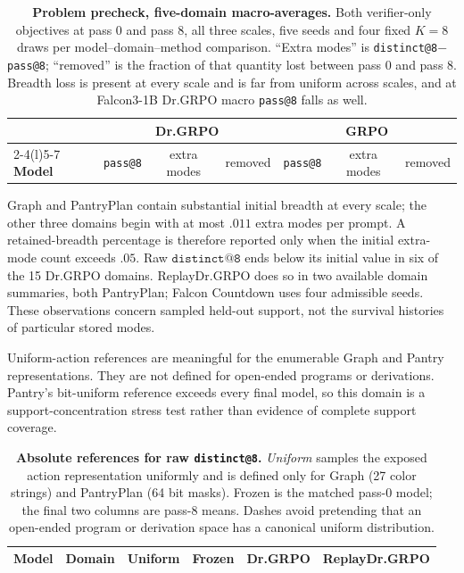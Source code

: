 \begin{table}[h]
  \centering
  \caption{\textbf{Problem precheck, five-domain macro-averages.} Both
  verifier-only objectives at pass 0 and pass 8, all three scales, five seeds
  and four fixed $K=8$ draws per model--domain--method comparison. ``Extra modes'' is
  \texttt{distinct@8}$-$\texttt{pass@8}; ``removed'' is the fraction of that
  quantity lost between pass 0 and pass 8. Breadth loss is present at every
  scale and is far from uniform across scales, and at Falcon3-1B Dr.GRPO
  macro \texttt{pass@8} falls as well.}
  \label{tab:baseline-collapse-precheck}
  \small
  \setlength{\tabcolsep}{4.5pt}
  \begin{tabular}{@{}l*{6}{c}@{}}
    \toprule
    & \multicolumn{3}{c}{\textbf{Dr.GRPO}} & \multicolumn{3}{c}{\textbf{GRPO}} \\
    \cmidrule(lr){2-4}\cmidrule(l){5-7}
    \textbf{Model} & \texttt{pass@8} & extra modes & removed
                   & \texttt{pass@8} & extra modes & removed \\
    \midrule
    
  \end{tabular}
\end{table}


Graph and PantryPlan contain substantial initial breadth at every scale;
the other three domains begin with at most $.011$ extra modes per prompt.
A retained-breadth percentage is therefore reported only when the initial
extra-mode count exceeds $.05$. Raw $\texttt{distinct@8}$ ends below its
initial value in six of the 15 Dr.GRPO domains. ReplayDr.GRPO does so in
two available domain summaries, both PantryPlan; Falcon Countdown uses
four admissible seeds. These observations concern sampled held-out support,
not the survival histories of particular stored modes.

Uniform-action references are meaningful for the enumerable Graph and
Pantry representations. They are not defined for open-ended programs or
derivations. Pantry's bit-uniform reference exceeds every final model, so
this domain is a support-concentration stress test rather than evidence
of complete support coverage.

\begin{table}[t]
  \centering
  \caption{\textbf{Absolute references for raw \texttt{distinct@8}.}
  \emph{Uniform} samples the exposed action representation uniformly and is
  defined only for Graph (27 color strings) and PantryPlan (64 bit masks).
  Frozen is the matched pass-0 model; the final two columns are pass-8 means.
  Dashes avoid pretending that an open-ended program or derivation space has a
  canonical uniform distribution.}
  \label{tab:absolute-support-references}
  \scriptsize
  \setlength{\tabcolsep}{4.2pt}
  \begin{tabular}{@{}llrrrr@{}}
    \toprule
    \textbf{Model} & \textbf{Domain} & \textbf{Uniform} & \textbf{Frozen}
      & \textbf{Dr.GRPO} & \textbf{ReplayDr.GRPO} \\
    \midrule
    
  \end{tabular}
\end{table}


